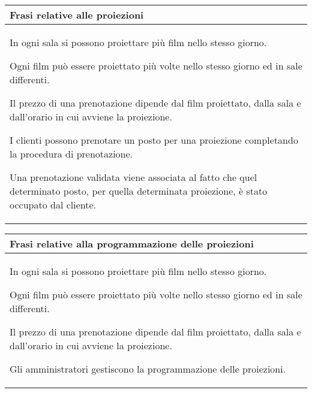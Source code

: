 \begin{tabularx}{\linewidth}{|X|}
    \hline
    \rowcolor{tblhdrcolor}
    \textbf{Frasi relative alle proiezioni} \\\hline
    In ogni sala si possono proiettare più film nello stesso giorno.

    Ogni film può essere proiettato più volte nello stesso giorno ed in sale
    differenti.

    Il prezzo di una prenotazione dipende dal film proiettato,
    dalla sala e dall'orario in cui avviene la proiezione.

    I clienti possono prenotare un posto per una proiezione
    completando la procedura di prenotazione.

    Una prenotazione validata viene associata al fatto che quel
    determinato posto, per quella determinata proiezione,
    è stato occupato dal cliente.
    \\ \hline
\end{tabularx}

\begin{tabularx}{\linewidth}{|X|}
    \hline
    \rowcolor{tblhdrcolor}
    \textbf{Frasi relative alla programmazione delle proiezioni} \\\hline

    In ogni sala si possono proiettare più film nello stesso giorno.

    Ogni film può essere proiettato più volte nello stesso giorno ed in sale
    differenti.

    Il prezzo di una prenotazione dipende dal film proiettato,
    dalla sala e dall'orario in cui avviene la proiezione.

    Gli amministratori gestiscono la programmazione delle proiezioni.
    \\ \hline
\end{tabularx}

